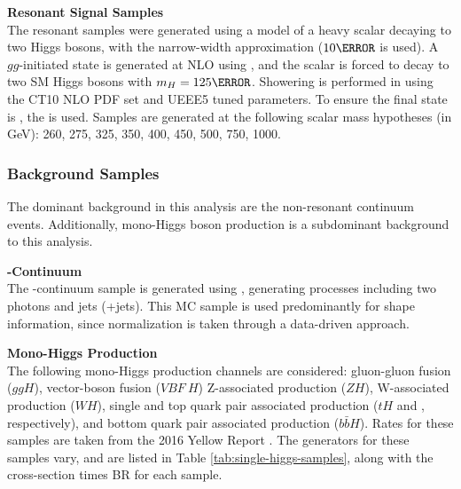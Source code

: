 \noindent\textbf{Resonant Signal Samples}\\
\indent The resonant samples were generated using a model of a heavy scalar decaying to two Higgs bosons, with the narrow-width approximation ($\unit{10}{\MeV}$ is used). A $gg$-initiated state is generated at NLO using \AMCatNLO, and the scalar is forced to decay to two \gls{SM} Higgs bosons with $m_H = \unit{125}{\GeV}$. Showering is performed in \HERWIGpp using the CT10 NLO \gls{PDF} set and UEEE5 tuned parameters. To ensure the final state is \yybb, the  is used. Samples are generated at the following scalar mass hypotheses (in GeV): 260, 275, 325, 350, 400, 450, 500, 750, 1000.


\subsubsection{Background Samples}

The dominant background in this analysis are the non-resonant \myy continuum events. Additionally, mono-Higgs boson production is a subdominant background to this analysis. 

\noindent\textbf{\yy-Continuum}\\
\indent The \yy-continuum sample is generated using \SHERPA, generating processes including two photons and jets (\yy+jets). This \gls{MC} sample is used predominantly for shape information, since normalization is taken through a data-driven approach. 

\noindent\textbf{Mono-Higgs Production}\\
\indent The following mono-Higgs production channels are considered: gluon-gluon fusion ($ggH$), vector-boson fusion ($VBF\ H$) Z-associated production ($ZH$), W-associated production ($WH$), single and top quark pair associated production ($tH$ and \tth, respectively), and bottom quark pair associated production ($b\bar{b}H$). Rates for these samples are taken from the 2016 Yellow Report \cite{yellow-report}. The generators for these samples vary, and are listed in Table \ref{tab:single-higgs-samples}, along with the cross-section times \gls{BR} for each sample.

